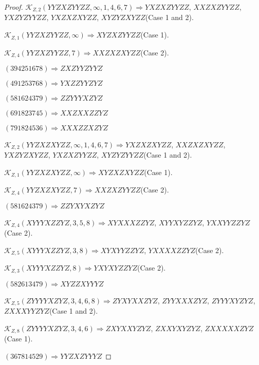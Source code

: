 \documentclass[12pt]{article}
\theoremstyle{plain}
\theoremstyle{definition}
\theoremstyle{remark}
\newcommand{\fancy}[1]{\mathcal{#1}}
\def\K{\fancy{K}}
\begin{document}
\begin{proof}
	
	
	$\K_{Z,2}(YYZXZYYZZ,\infty,1, 4, 6, 7)\Rightarrow $$YXZXZYYZZ$, $XXZXZYYZZ$, $YXZYZYYZZ$, $YXZXZXYZZ$, $XYZYZXYZZ$(Case 1 and 2).
	
	$\K_{Z,1}(YYZXZYYZZ,\infty)\Rightarrow $$XYZXZYYZZ$(Case 1).
	
	$\K_{Z,4}(YYZXZYYZZ,7)\Rightarrow $$XXZXZXYZZ$(Case 2).
	
	
	
	$(3 9 4 2 5 1 6 7 8)\Rightarrow ZXZYYZYYZ$
	
	$(4 9 1 2 5 3 7 6 8)\Rightarrow YXZZYYZYZ$
	
	$(5 8 1 6 2 4 3 7 9)\Rightarrow ZZYYYXZYZ$
	
	$(6 9 1 8 2 3 7 4 5)\Rightarrow XXZXXZZYZ$
	
	$(7 9 1 8 2 4 5 3 6)\Rightarrow XXXZZXZYZ$
	
	
	
	$\K_{Z,2}(YYZXZXYZZ,\infty,1, 4, 6, 7)\Rightarrow $$YXZXZXYZZ$, $XXZXZXYZZ$, $YXZYZXYZZ$, $YXZXZYYZZ$, $XYZYZYYZZ$(Case 1 and 2).
	
	$\K_{Z,1}(YYZXZXYZZ,\infty)\Rightarrow $$XYZXZXYZZ$(Case 1).
	
	$\K_{Z,4}(YYZXZXYZZ,7)\Rightarrow $$XXZXZYYZZ$(Case 2).
	
	
	
	$(5 8 1 6 2 4 3 7 9)\Rightarrow ZZYXYXZYZ$
	
	
	
	$\K_{Z,4}(XYYYXZZYZ,3, 5, 8)\Rightarrow $$XYXXXZZYZ$, $XYYXYZZYZ$, $YXXYYZZYZ$(Case 2).
	
	$\K_{Z,5}(XYYYXZZYZ,3, 8)\Rightarrow $$XYXYYZZYZ$, $YXXXXZZYZ$(Case 2).
	
	$\K_{Z,3}(XYYYXZZYZ,8)\Rightarrow $$YXYXYZZYZ$(Case 2).
	
	
	
	$(5 8 2 6 1 3 4 7 9)\Rightarrow XYZZXYYYZ$
	
	
	
	$\K_{Z,5}(ZYYYYXZYZ,3, 4, 6, 8)\Rightarrow $$ZYXYXXZYZ$, $ZYYXXXZYZ$, $ZYYYXYZYZ$, $ZXXXYYZYZ$(Case 1 and 2).
	
	$\K_{Z,8}(ZYYYYXZYZ,3, 4, 6)\Rightarrow $$ZXYXXYZYZ$, $ZXXYXYZYZ$, $ZXXXXXZYZ$(Case 1).
	
	
	
	$(3 6 7 8 1 4 5 2 9)\Rightarrow YYZXZYYYZ$
	
	
	
	
	

\end{proof}
\end{document}
